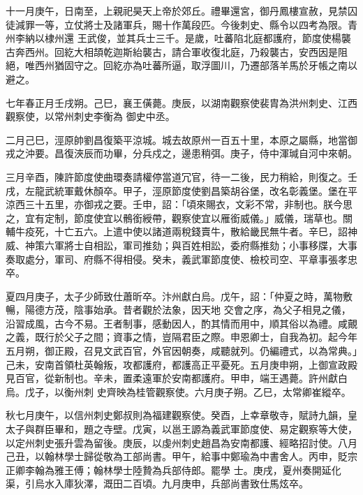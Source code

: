 \begin{pinyinscope}
 十一月庚午，日南至，上親祀昊天上帝於郊丘。禮畢還宮，御丹鳳樓宣赦，見禁囚徒減罪一等，立仗將士及諸軍兵，賜十作萬段匹。今後刺史、縣令以四考為限。青州李納以棣州還
 王武俊，並其兵士三千。是歲，吐蕃陷北庭都護府，節度使楊襲古奔西州。回紇大相頡乾迦斯紿襲古，請合軍收復北庭，乃殺襲古，安西因是阻絕，唯西州猶固守之。回紇亦為吐蕃所逼，取浮圖川，乃遷部落羊馬於牙帳之南以避之。



 七年春正月壬戌朔。己巳，襄王僙薨。庚辰，以湖南觀察使裴胄為洪州刺史、江西觀察使，以常州刺史李衡為
 御史中丞。



 二月己巳，涇原帥劉昌復築平涼城。城去故原州一百五十里，本原之屬縣，地當御戎之沖要。昌復浹辰而功畢，分兵戍之，邊患稍弭。庚子，侍中渾瑊自河中來朝。



 三月辛酉，陳許節度使曲環奏請權停當道冗官，待一二後，民力稍給，則復之。壬戌，左龍武統軍戴休顏卒。甲子，涇原節度使劉昌築胡谷堡，改名彰義堡。堡在平涼西三十五里，亦御戎之要。壬申，詔：「頃來賜衣，文彩不常，非制也。朕今思
 之，宜有定制，節度使宜以鶻銜綬帶，觀察使宜以雁銜威儀。」威儀，瑞草也。關輔牛疫死，十亡五六。上遣中使以諸道兩稅錢賣牛，散給畿民無牛者。辛巳，詔神威、神策六軍將士自相訟，軍司推劾；與百姓相訟，委府縣推劾；小事移牒，大事奏取處分，軍司、府縣不得相侵。癸未，義武軍節度使、檢校司空、平章事張孝忠卒。



 夏四月庚子，太子少師致仕蕭昕卒。汴州獻白烏。戊午，詔：「仲夏之時，萬物敷暢，陽德方茂，陰事始承。昔者觀於法象，因天地
 交會之序，為父子相見之儀，沿習成風，古今不易。王者制事，感動因人，酌其情而用中，順其俗以為禮。咸覿之義，既行於父子之間；資事之情，豈隔君臣之際。申恩卿士，自我為初。起今年五月朔，御正殿，召見文武百官，外官因朝奏，咸聽就列。仍編禮式，以為常典。」己未，安南首領杜英翰叛，攻都護府，都護高正平憂死。五月庚申朔，上御宣政殿見百官，從新制也。辛未，置柔遠軍於安南都護府。甲申，端王遇薨。許州獻白烏。戊子，以衡州刺
 史齊映為桂管觀察使。六月庚子朔。乙巳，太常卿崔縱卒。



 秋七月庚午，以信州刺史鄭叔則為福建觀察使。癸酉，上幸章敬寺，賦詩九韻，皇太子與群臣畢和，題之寺壁。戊寅，以邕王謜為義武軍節度使、易定觀察等大使，以定州刺史張升雲為留後。庚辰，以虔州刺史趙昌為安南都護、經略招討使。八月己丑，以翰林學士歸從敬為工部尚書。甲午，給事中鄭瑜為中書舍人。丙申，貶宗正卿李翰為雅王傅；翰林學士陸贄為兵部侍郎。罷學
 士。庚戌，夏州奏開延化渠，引烏水入庫狄澤，溉田二百頃。九月庚申，兵部尚書致仕馬炫卒。




\end{pinyinscope}
